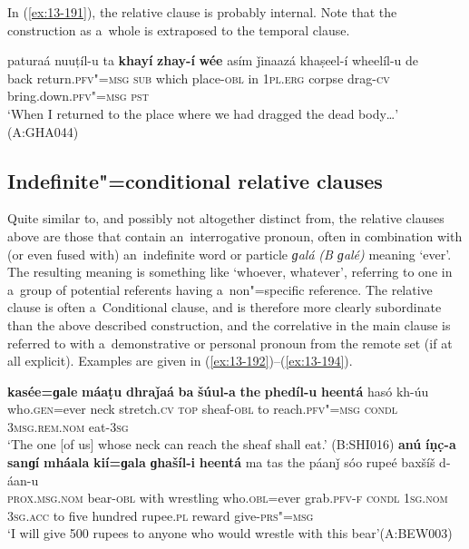 In (\ref{ex:13-191}), the relative clause is probably internal. Note that the construction as a~whole is extraposed to the temporal clause.

\begin{exe}
\ex
\label{ex:13-191}
\gll paturaá nuuṭíl-u ta \textbf{khayí} \textbf{zhay-í} \textbf{wée} asím  ǰinaazá khaṣeel-í wheelíl-u de \\
back return.\textsc{pfv"=msg} \textsc{sub} which place-\textsc{obl} in \textsc{1pl.erg} corpse drag-\textsc{cv}  bring.down.\textsc{pfv"=msg} \textsc{pst}   \\
\glt `When I returned to the place where we had dragged the dead body{\ldots}' (A:GHA044)
\end{exe}

\subsection{Indefinite"=conditional relative clauses}
\label{subsec:13-6-2}

Quite similar to, and possibly not altogether distinct from, the relative clauses above are those that contain an~interrogative pronoun, often in combination with (or even fused with) an~indefinite word or particle \textit{ɡalá} \textit{(B ɡalé)} meaning `ever'. The resulting meaning is something like `whoever, whatever', referring to one in a~group of potential referents having a~non"=specific reference. The relative clause is often a~Conditional clause, and is therefore more clearly subordinate than the above described construction, and the correlative in the main clause is referred to with a~demonstrative or personal pronoun from the remote set (if at all explicit). Examples are given in (\ref{ex:13-192})--(\ref{ex:13-194}).
\largerpage

\ea
\label{ex:13-192}
\gll \textbf{kasée=ɡale} \textbf{máaṭu} \textbf{dhraǰaá} \textbf{ba} \textbf{šúul-a} \textbf{the} \textbf{phedíl-u} \textbf{heentá} hasó kh-úu\\
who.\textsc{gen}=ever neck stretch.\textsc{cv} \textsc{top} sheaf-\textsc{obl} to  reach.\textsc{pfv"=msg} \textsc{condl} \textsc{3msg.rem.nom} eat-\textsc{3sg}\\
\glt `The one [of us] whose neck can reach the sheaf shall eat.' (B:SHI016)
\ex
\label{ex:13-193}
\gll \textbf{anú} \textbf{íṇc̣-a} \textbf{sanɡí} \textbf{mháala} \textbf{kií=ɡala} \textbf{ɡhašíl-i}  \textbf{heentá} ma tas the páanǰ sóo rupeé baxšíš d-áan-u\\
\textsc{prox.msg.nom}{\protect\footnotemark} bear-\textsc{obl} with wrestling who.\textsc{obl}=ever grab.\textsc{pfv-f} \textsc{condl} \textsc{1sg.nom} \textsc{3sg.acc} to five hundred rupee.\textsc{pl} reward give-\textsc{prs"=msg}\\
\glt `I will give 500 rupees to anyone who would wrestle with this bear'\newline (A:BEW003)

